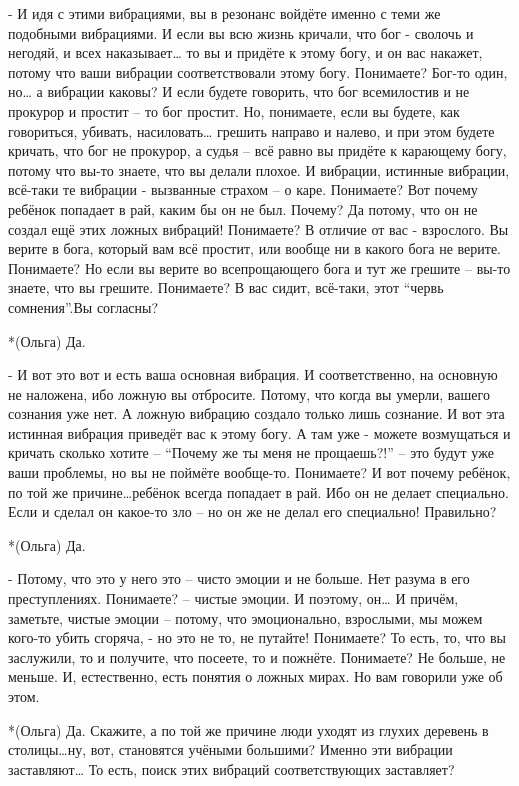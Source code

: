 - И идя с этими вибрациями, вы в резонанс войдёте именно  с теми же подобными вибрациями. И если вы всю жизнь кричали, что бог - сволочь и негодяй, и всех наказывает… то вы и придёте к этому богу, и он вас накажет, потому что ваши вибрации соответствовали этому богу. Понимаете? Бог-то один, но… а вибрации каковы? И если будете говорить, что бог всемилостив и не прокурор и простит – то бог простит. Но, понимаете, если вы будете, как говориться, убивать, насиловать… грешить направо и налево, и при этом будете кричать, что бог не прокурор, а судья – всё равно вы придёте к карающему богу, потому что вы-то знаете, что вы делали плохое. И вибрации, истинные вибрации, всё-таки те вибрации - вызванные страхом – о каре. Понимаете?  Вот почему ребёнок попадает в рай, каким бы он не был. Почему? Да потому, что он не создал ещё этих ложных вибраций! Понимаете? В отличие от вас - взрослого. Вы верите в бога, который вам всё простит, или вообще ни в какого бога не верите. Понимаете? Но если вы верите во всепрощающего бога и тут же грешите – вы-то знаете, что вы грешите. Понимаете? В вас сидит, всё-таки, этот “червь сомнения”.Вы согласны?

*(Ольга) Да.

- И вот это вот и есть ваша основная вибрация. И соответственно, на основную не наложена, ибо ложную вы отбросите. Потому, что когда вы умерли, вашего сознания уже нет. А ложную вибрацию создало только лишь сознание.  И вот эта истинная вибрация приведёт вас к этому богу. А там уже  - можете возмущаться и кричать сколько хотите – “Почему же ты меня не прощаешь?!” – это будут уже ваши проблемы, но вы не поймёте вообще-то. Понимаете? И вот почему ребёнок, по той же причине…ребёнок всегда попадает в рай. Ибо он не делает специально. Если и сделал он какое-то зло – но он же не делал его специально! Правильно?

*(Ольга) Да.

- Потому, что это у него это – чисто эмоции и не больше. Нет разума в его преступлениях. Понимаете? – чистые эмоции. И поэтому, он… И причём, заметьте, чистые эмоции – потому, что эмоционально, взрослыми, мы можем кого-то убить сгоряча, - но это не то, не путайте! Понимаете? То есть, то, что вы заслужили, то и получите, что посеете, то и пожнёте. Понимаете? Не больше, не меньше. И, естественно, есть понятия о ложных мирах. Но вам говорили уже об этом.

*(Ольга) Да. Скажите, а по той же причине люди уходят из глухих деревень в столицы…ну, вот, становятся учёными большими? Именно эти вибрации заставляют… То есть, поиск этих вибраций соответствующих заставляет?

